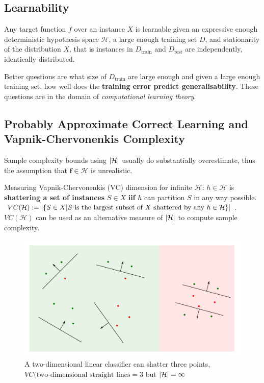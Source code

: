 \documentclass[11pt]{article}
\theoremstyle{definition}
\newcommand*\Hilbert{\ensuremath{\mathcal{H}}}
\DeclarePairedDelimiter\abs{\lvert}{\rvert}
\begin{document}
\subsection{Learnability}
Any target function $f$ over an instance $X$ is learnable given an expressive enough deterministic hypothesis space \Hilbert, a large enough training set $D$, and stationarity of the distribution $X$, that is instances in $D_{\text{train}}$ and $D_{\text{test}}$ are independently, identically distributed.

Better questions are what size of \textbf{$D_{\text{train}}$} are large enough and given a large enough training set, how well does the \textbf{training error predict generalisability}. These questions are in the domain of \emph{computational learning theory}.

\subsection{Probably Approximate Correct Learning and Vapnik-Chervonenkis Complexity}
Sample complexity bounds using $\abs{\Hilbert}$ usually do substantially overestimate, thus the assumption that $\bm{f} \in \Hilbert$ is unrealistic.

Measuring Vapnik-Chervonenkis (VC) dimension for infinite \Hilbert:
$h\in\Hilbert$ is \textbf{shattering a set of instances} $S\in X$ \textbf{iif} $h$ can partition $S$ in any way possible.\\
$VC(\Hilbert) := \abs{\{S\in X | S\ \text{is the largest subset of}\ X\ \text{shattered by any}\ h\in\Hilbert\}}$. $VC(\Hilbert)$ can be used as an alternative measure of $\abs{\Hilbert}$ to compute sample complexity.

\begin{figure}[H]
	\centering
	\includegraphics[keepaspectratio,width=0.9\linewidth]{VC_shattering}
	\caption{A two-dimensional linear classifier can shatter three points, $VC(\text{two-dimensional straight lines}=3$ but $\abs{\Hilbert} = \infty$}
\end{figure}
\end{document}
